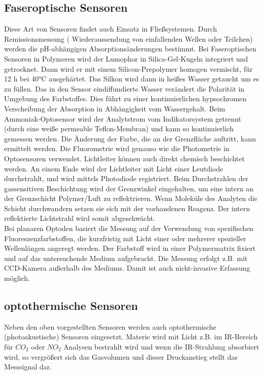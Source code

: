 \subsection{Faseroptische Sensoren}
Diese Art von Sensoren findet auch Einsatz in Fließsystemen. Durch Remissionsmessung ( Wiederaussendung von einfallenden Wellen oder Teilchen) werden die pH-abhängigen Absorptionsänderungen bestimmt.
Bei Faseroptischen Sensoren in Polymeren wird der Lumophor in Silica-Gel-Kugeln integriert und getrocknet. Dann wird er mit einem Silicon-Prepolymer homogen vermischt, für 12 h bei 40°C ausgehärtet. Das Silkon wird dann in heißes Wasser getaucht um  es zu füllen. Das in den Sensor eindiffundierte Wasser verändert die Polarität in Umgebung des Farbstoffes. Dies führt zu einer kontinuierlichen hypsochromen Verscheibung der Absorption in Abhängigkeit vom Wassergehalt. \cite{[6]} %
Beim Ammoniak-Optosensor  wird der Analytstrom vom Indikatorsystem getrennt (durch eine weiße permeable Teflon-Membran) und kann so kontinuierlich gemessen werden. Die Änderung der Farbe, die an der Grenzfläche auftritt, kann ermittelt werden. Die Fluorometrie wird genauso wie die Photometrie in Optosensoren verwendet. Lichtleiter können auch direkt chemisch beschichtet werden. An einem Ende wird der Lichtleiter mit Licht einer Leutdiode durchstrahlt, und wird mittels Photodiode registriert. Beim Durchstrahlen der gassensitiven Beschichtung wird der Grenzwinkel eingehalten, um  eine intern an der Grenzschicht Polymer/Luft zu reflektrieren. Wenn Moleküle des Analyten die Schicht durchwandern setzen sie sich mit der vorhandenen Reagenz. Der intern reflektierte Lichtstrahl wird somit abgeschwächt.\cite{[5]}
\\Bei planaren Optoden basiert die Messung auf der Verwendung von spezifischen Fluoreszenzfarbstoffen, die kurzfristig mit Licht einer oder mehrerer spezieller Wellenlängen angeregt werden. Der Farbstoff wird in einer Polymermatrix fixiert und auf das untersuchende Medium aufgebracht. Die Messung erfolgt z.B. mit CCD-Kamera außerhalb des Mediums. Damit ist auch nicht-invasive Erfassung möglich. %
\subsection{optothermische Sensoren}
Neben den oben vorgestellten Sensoren werden auch optothermische (photoakustische) Sensoren eingesetzt. Materie wird mit Licht z.B. im IR-Bereich für $CO_2$ oder $NO_2$ Analysen bestrahlt wird und wenn die IR-Strahlung absorbiert wird, so vergrößert sich das Gasvolumen und dieser Druckanstieg stellt das Messsignal dar. \cite{[5]}

